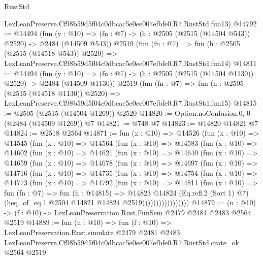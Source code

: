 \begin{lexlean}{RustStd}
\begin{coremodule}
    LexLeanPreserve.Cf98b59d5f04c0dbcac5e0ee007efbfe0.R7.RustStd.fun13)
@14792 := @14494
    (fun (y : @10) => (fn : @7) -> (h : @2505 (@2515 (@14504 @543)) @2520) -> @2484 (@14509 @543))
    @2519
    (fun (fn : @7) =>
    fun (h : @2505 (@2515 (@14518 @543)) @2520) =>
    LexLeanPreserve.Cf98b59d5f04c0dbcac5e0ee007efbfe0.R7.RustStd.fun14)
@14811 := @14494
    (fun (y : @10) => (fn : @7) -> (h : @2505 (@2515 (@14504 @1130)) @2520) -> @2484 (@14509 @1130))
    @2519
    (fun (fn : @7) =>
    fun (h : @2505 (@2515 (@14518 @1130)) @2520) =>
    LexLeanPreserve.Cf98b59d5f04c0dbcac5e0ee007efbfe0.R7.RustStd.fun15)
@14815 := @2505 (@2515 (@14504 @1269)) @2520
@14820 := Option.noConfusion.{0, 0} (@2484 (@14509 @1269)) @7
@14821 := @748 @7
@14823 := @14820 @14821 @7
@14824 := @2518 @2564
@14871 := fun (x : @10) =>
  @14526
    (fun (x : @10) =>
    @14545
      (fun (x : @10) =>
      @14564
        (fun (x : @10) =>
        @14583
          (fun (x : @10) =>
          @14602
            (fun (x : @10) =>
            @14621
              (fun (x : @10) =>
              @14640
                (fun (x : @10) =>
                @14659
                  (fun (x : @10) =>
                  @14678
                    (fun (x : @10) =>
                    @14697
                      (fun (x : @10) =>
                      @14716
                        (fun (x : @10) =>
                        @14735
                          (fun (x : @10) =>
                          @14754
                            (fun (x : @10) =>
                            @14773
                              (fun (x : @10) =>
                              @14792
                                (fun (x : @10) =>
                                @14811
                                  (fun (x : @10) =>
                                  fun (fn : @7) =>
                                  fun (h : @14815) =>
                                  @14823
                                    @14824
                                    (Eq.refl.{2} (Sort 1) @7)
                                    (heq_of_eq.{1} @2504 @14821 @14824 @2519)))))))))))))))))
@14879 := (n : @10) -> (f : @10) -> LexLeanPreservation.Rust.FunSem @2479 @2481 @2483 @2564 @2519
@14889 := fun (n : @10) =>
  fun (f : @10) =>
  LexLeanPreservation.Rust.simulate
    @2479
    @2481
    @2483
    LexLeanPreserve.Cf98b59d5f04c0dbcac5e0ee007efbfe0.R7.RustStd.crate_ok
    @2564
    @2519
\end{coremodule}
\end{lexlean}

